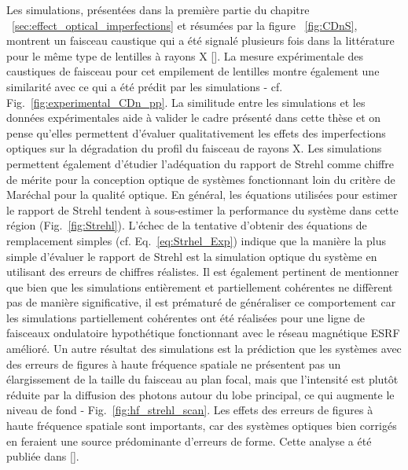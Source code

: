 \begin{refsection}
Les simulations, présentées dans la première partie du chapitre ~\ref{sec:effect_optical_imperfections} et résumées par la figure ~\ref{fig:CDnS}, montrent un faisceau caustique qui a été signalé plusieurs fois dans la littérature pour le même type de lentilles à rayons X [\cite{Schropp2013,Seiboth2017,Seiboth2020}]. La mesure expérimentale des caustiques de faisceau pour cet empilement de lentilles montre également une similarité avec ce qui a été prédit par les simulations - cf. Fig.~\ref{fig:experimental_CDn_pp}. La similitude entre les simulations et les données expérimentales aide à valider le cadre présenté dans cette thèse et on pense qu'elles permettent d'évaluer qualitativement les effets des imperfections optiques sur la dégradation du profil du faisceau de rayons X. Les simulations permettent également d'étudier l'adéquation du rapport de Strehl comme chiffre de mérite pour la conception optique de systèmes fonctionnant loin du critère de Maréchal pour la qualité optique. En général, les équations utilisées pour estimer le rapport de Strehl tendent à sous-estimer la performance du système dans cette région (Fig.~\ref{fig:Strehl}). L'échec de la tentative d'obtenir des équations de remplacement simples (cf. Eq.~\ref{eq:Strhel_Exp}) indique que la manière la plus simple d'évaluer le rapport de Strehl est la simulation optique du système en utilisant des erreurs de chiffres réalistes. Il est également pertinent de mentionner que bien que les simulations entièrement et partiellement cohérentes ne diffèrent pas de manière significative, il est prématuré de généraliser ce comportement car les simulations partiellement cohérentes ont été réalisées pour une ligne de faisceaux ondulatoire hypothétique fonctionnant avec le réseau magnétique ESRF amélioré. Un autre résultat des simulations est la prédiction que les systèmes avec des erreurs de figures à haute fréquence spatiale ne présentent pas un élargissement de la taille du faisceau au plan focal, mais que l'intensité est plutôt réduite par la diffusion des photons autour du lobe principal, ce qui augmente le niveau de fond - Fig.~\ref{fig:hf_strehl_scan}. Les effets des erreurs de figures à haute fréquence spatiale sont importants, car des systèmes optiques bien corrigés en feraient une source prédominante d'erreurs de forme. Cette analyse a été publiée dans [\cite{Celestre2020}].



\end{refsection}
